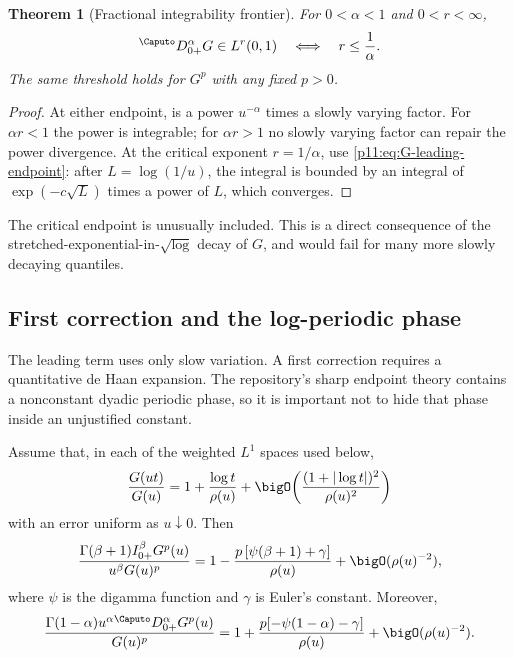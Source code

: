 \documentclass[11pt,oneside]{article}
\newtheorem{theorem}{Theorem}[section]
\theoremstyle{definition}
\theoremstyle{remark}
\newcommand{\1}{\mathbf 1}
\begin{document}
\begin{theorem}[Fractional integrability frontier]
\label{p11:thm:caputo-Lp}
For $0<\alpha<1$ and $0<r<\infty$,
\begin{equation}
 {}^{\Caputo}D_{0+}^{\alpha}G\in L^r(0,1)
 \quad\Longleftrightarrow\quad
 r\le\frac1\alpha.
 \label{p11:eq:caputo-Lp-frontier}
\end{equation}
The same threshold holds for $G^p$ with any fixed $p>0$.
\end{theorem}

\begin{proof}
At either endpoint,  is a power
$u^{-\alpha}$ times a slowly varying factor.  For $\alpha r<1$ the power is
integrable; for $\alpha r>1$ no slowly varying factor can repair the power
divergence.  At the critical exponent $r=1/\alpha$, use
\eqref{p11:eq:G-leading-endpoint}: after $L=\log(1/u)$, the integral is bounded by
an integral of $\exp(-c\sqrt L)$ times a power of $L$, which converges.
\end{proof}

The critical endpoint is unusually included.  This is a direct consequence
of the stretched-exponential-in-$\sqrt{\log}$ decay of $G$, and would fail for
many more slowly decaying quantiles.

\subsection{First correction and the log-periodic phase}

The leading term uses only slow variation.  A first correction requires a
quantitative de Haan expansion.  The repository's sharp endpoint theory
contains a nonconstant dyadic periodic phase, so it is important not to hide
that phase inside an unjustified constant.

\begin{conditionaltheorem}
\label{p11:thm:first-correction}
Assume that, in each of the weighted $L^1$ spaces used below,
\begin{equation}
 \frac{G(ut)}{G(u)}
 =1+\frac{\log t}{\rho(u)}
 +\bigO\!\left(\frac{(1+|\log t|)^2}{\rho(u)^2}\right)
 \label{p11:eq:de-Haan-assumption}
\end{equation}
with an error uniform as $u\downarrow0$.  Then
\begin{equation}
 \frac{\Gamma(\beta+1)I_{0+}^{\beta}G^p(u)}
      {u^\beta G(u)^p}
 =1-\frac{p\,[\psi(\beta+1)+\gamma]}{\rho(u)}
 +\bigO(\rho(u)^{-2}),
 \label{p11:eq:RL-first-correction}
\end{equation}
where $\psi$ is the digamma function and $\gamma$ is Euler's constant.
Moreover,
\begin{equation}
 \frac{\Gamma(1-\alpha)u^\alpha
       {}^{\Caputo}D_{0+}^{\alpha}G^p(u)}{G(u)^p}
 =1+\frac{p[-\psi(1-\alpha)-\gamma]}{\rho(u)}
 +\bigO(\rho(u)^{-2}).
 \label{p11:eq:Caputo-first-correction}
\end{equation}
\end{conditionaltheorem}
\end{document}
